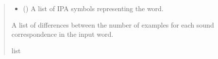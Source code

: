 \documentclass[letterpaper,10pt,english]{sphinxmanual}
\begin{document}
\begin{fulllineitems}
\begin{fulllineitems}
\begin{quote}
\begin{description}
\begin{itemize}
\item {} 
\sphinxAtStartPar
{} () \textendash{} A list of IPA symbols representing the word.

\end{itemize}

\sphinxAtStartPar
A list of differences between the number of examples for each
sound correspondence in the input word.

\sphinxAtStartPar
list

\end{description}\end{quote}

\sphinxAtStartPar
{}


\end{fulllineitems}
\end{fulllineitems}
\end{document}
